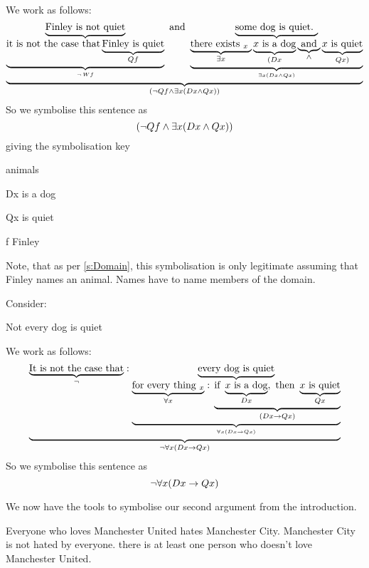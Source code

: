We work as follows:
\begin{equation*}
\underbrace{
	\underbrace{\text{Finley is not quiet}}_{
		\underbrace{\text{it is not the case that}
			\underbrace{\text{Finley is quiet}}_{Qf}
		}_{\neg\,Wf}
		}
 	\text{ and }
	\underbrace{\text{some dog is quiet. }}_{
		\underbrace{\underbrace{\text{there exists $_x$ }}_{\exists x} \underbrace{\text{$x$ is a dog}}_{(Dx}\underbrace{\text{ and }}_{\wedge}\underbrace{\text{$x$ is quiet}}_{Qx)}}_{\exists x(Dx\wedge Qx)}
		}
}_{(\neg Qf\mathbin{\wedge} \exists x(Dx\wedge Qx))}
\end{equation*}
So we symbolise this sentence as $$(\neg Qf\mathbin{\wedge} \exists x(Dx\wedge Qx))$$
giving the symbolisation key
\begin{ekey}
\item[\text{domain}]animals
\item[Dx] is a dog
\item[Qx] is quiet
\item[f] Finley
\end{ekey}
Note, that as per \ref{s:Domain}, this symbolisation is only legitimate assuming that Finley names an animal. Names have to name members of the domain.

Consider:
\begin{earg}
\item[\ex{q.notevery}]Not every dog is quiet
\end{earg}

We work as follows:
\begin{equation*}
\underbrace{
	\underbrace{\text{It is not the case that}}_{\neg}:
		\underbrace{\text{every dog is quiet}}_
		{
							\underbrace{\underbrace{\text{for every thing $_x$}}_{\forall x}
									:\,
					\underbrace{
					\text{if }
						\underbrace{\text{$x$ is a dog}}_{Dx},
					\text{ then }
						\underbrace{\text{$x$ is quiet}}_{Qx}
					}
					_{(Dx\rightarrow Qx)}
}				
				_{\forall x(Dx\rightarrow Qx)}}
}
_{\neg \forall x(Dx\rightarrow Qx)}
\end{equation*}
So we symbolise this sentence as $$\neg \forall x(Dx\rightarrow Qx)$$



We now have the tools to symbolise our second argument from the introduction.

\begin{earg}
\prem Everyone who loves Manchester United hates Manchester City.
\prem Manchester City is not hated by everyone.
\conc there is at least one person who doesn't love Manchester United.
\end{earg}

